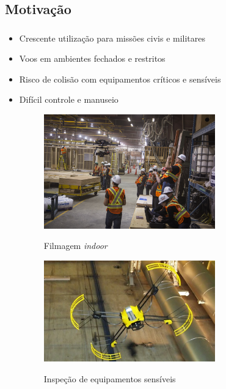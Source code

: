 \documentclass{beamer}
\begin{document}
\subsection*{Motivação}

\begin{frame}[allowframebreaks]
	\frametitle{\insertsection}
	\begin{itemize}
	    \item Crescente utilização para missões civis e militares
	     
	    \item Voos em ambientes fechados e restritos
	     
	    \item Risco de colisão com equipamentos críticos e sensíveis
	    
	    \item Difícil controle e manuseio
	    
	    
	\framebreak
		\vspace{2cm}
		
		\begin{figure}
			\centering
			\includegraphics[keepaspectratio = true,
			width=0.7\textwidth]{img/filmagem_drone.jpg}
			\label{fig:obr2013}
			\caption{Filmagem \textit{indoor}}
		\end{figure}
			
	\framebreak
		\vspace{2cm}
		
		\begin{figure}
			\centering
			\includegraphics[keepaspectratio = true,
			width=0.7\textwidth]{img/Inspection-Drone.jpg}
			\label{fig:obr2013}
			\caption{Inspeção de equipamentos sensíveis}
		\end{figure}
			
	\end{itemize}	
\end{frame}
\end{document}
